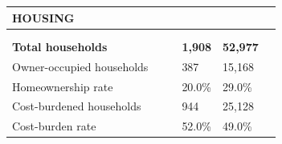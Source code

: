 \documentclass[9pt]{report}
\begin{document}
\vspace{12pt}
\setlength{\tabcolsep}{.01in} %
\begin{tabular}{p{.10in}p{.10in}p{.10in}p{3.7in}>{\hfill}p{.85in}>{\hfill}p{.85in}>{\hfill}p{.85in}>{\hfill}p{.85in}p{0.1in}}
\multicolumn{9}{l}{\parbox{7.1in}{\raggedright{\large{\strut\textbf{HOUSING}\strut}}}} \\ 
\hline
\multicolumn{4}{l}{\parbox{3.5in}{\raggedright{\textbf{}}}} & \multicolumn{1}{r}{\parbox{.85in}{\strut\raggedleft{\textbf{}\strut}}} & \multicolumn{1}{r}{\parbox{.85in}{\strut\raggedleft{\textbf{}\strut}}} & \multicolumn{1}{r}{\parbox{.85in}{\strut{}}} & \multicolumn{1}{r}{\parbox{.85in}{\strut{}}} & \\ 
\multicolumn{9}{l}{} \\ 
\multicolumn{4}{l}{\parbox{3.5in}{\strut\raggedright{\textbf{Total households}\strut}}} & \textbf{} & \textbf{} & \textbf{1,908} & \textbf{52,977} & \textbf{} \\ 
\multicolumn{4}{l}{\parbox{3.6in}{\strut\raggedright{{Owner-occupied households}}\strut}} &  &  & 387 & 15,168 & \multicolumn{1}{l}{}  \\ 
\multicolumn{4}{l}{\parbox{3.6in}{\strut\raggedright{{Homeownership rate}}\strut}} &  &  & 20.0\% & 29.0\% & \multicolumn{1}{l}{}  \\ 
\multicolumn{4}{l}{\parbox{3.6in}{\strut\raggedright{{Cost-burdened households}}\strut}} &  &  & 944 & 25,128 & \multicolumn{1}{l}{}  \\ 
\multicolumn{4}{l}{\parbox{3.6in}{\strut\raggedright{{Cost-burden rate}}\strut}} &  &  & 52.0\% & 49.0\% & \multicolumn{1}{l}{}  \\ 

\end{tabular}
\setlength{\tabcolsep}{6pt} %
\end{document}

